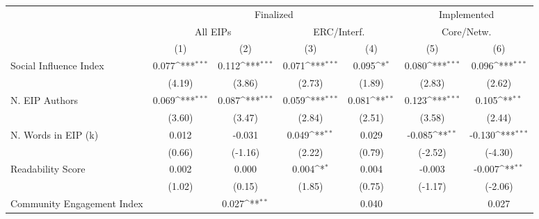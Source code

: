{
\def\sym#1{\ifmmode^{#1}\else\(^{#1}\)\fi}
\begin{tabular}{l*{6}{c}}
\hline\hline
& \multicolumn{4}{c}{Finalized} &  \multicolumn{2}{c}{Implemented}  \\ \cline{2-5}\cline{6-7}
& \multicolumn{2}{c}{All EIPs} &  \multicolumn{2}{c}{ERC/Interf.} &  \multicolumn{2}{c}{Core/Netw.} \\ \cline{2-3}\cline{4-5}\cline{6-7}
                                   &\multicolumn{1}{c}{(1)}         &\multicolumn{1}{c}{(2)}         &\multicolumn{1}{c}{(3)}         &\multicolumn{1}{c}{(4)}         &\multicolumn{1}{c}{(5)}         &\multicolumn{1}{c}{(6)}         \\
\hline
Social Influence Index             &       0.077\sym{***}&       0.112\sym{***}&       0.071\sym{***}&       0.095\sym{*}  &       0.080\sym{***}&       0.096\sym{***}\\
                                   &      (4.19)         &      (3.86)         &      (2.73)         &      (1.89)         &      (2.83)         &      (2.62)         \\
[1em]
N. EIP Authors                     &       0.069\sym{***}&       0.087\sym{***}&       0.059\sym{***}&       0.081\sym{**} &       0.123\sym{***}&       0.105\sym{**} \\
                                   &      (3.60)         &      (3.47)         &      (2.84)         &      (2.51)         &      (3.58)         &      (2.44)         \\
[1em]
N. Words in EIP (k)                &       0.012         &      -0.031         &       0.049\sym{**} &       0.029         &      -0.085\sym{**} &      -0.130\sym{***}\\
                                   &      (0.66)         &     (-1.16)         &      (2.22)         &      (0.79)         &     (-2.52)         &     (-4.30)         \\
[1em]
Readability Score                  &       0.002         &       0.000         &       0.004\sym{*}  &       0.004         &      -0.003         &      -0.007\sym{**} \\
                                   &      (1.02)         &      (0.15)         &      (1.85)         &      (0.75)         &     (-1.17)         &     (-2.06)         \\
[1em]
Community Engagement Index         &                     &       0.027\sym{**} &                     &       0.040         &                     &       0.027         \\

\end{tabular}}
